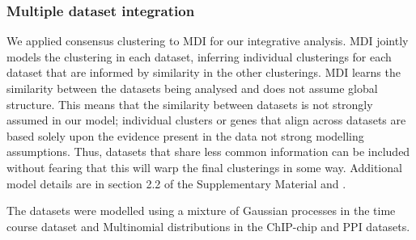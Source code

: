 \documentclass{bioinfo}
\begin{document}
\subsubsection{Multiple dataset integration}
We applied consensus clustering to MDI for our integrative analysis. MDI jointly models the clustering in each dataset, inferring individual clusterings for each dataset that are informed by similarity in the other clusterings. MDI learns the similarity between the datasets being analysed and does not assume global structure. This means that the similarity between datasets is not strongly assumed in our model; individual clusters or genes that align across datasets are based solely upon the evidence present in the data not strong modelling assumptions. Thus, datasets that share less common information can be included without fearing that this will warp the final clusterings in some way.
Additional model details are in section 2.2 of the Supplementary Material and \cite{kirk2012bayesian}.

The datasets were modelled using a mixture of Gaussian processes in the time course dataset and Multinomial distributions in the ChIP-chip and PPI datasets. 

\end{document}
